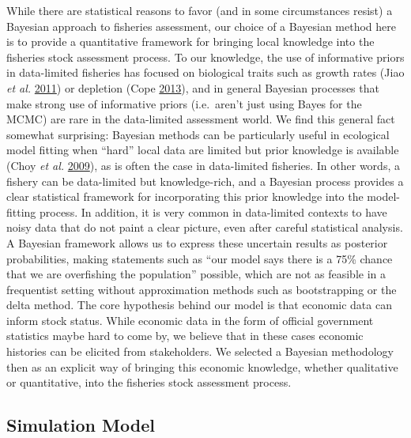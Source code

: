 \documentclass[twoside,12pt,final]{ucthesis-CA2012}
\begin{document}
\begin{ucmainmatter}
While there are statistical reasons to favor (and in some circumstances
resist) a Bayesian approach to fisheries assessment, our choice of a
Bayesian method here is to provide a quantitative framework for bringing
local knowledge into the fisheries stock assessment process. To our
knowledge, the use of informative priors in data-limited fisheries has
focused on biological traits such as growth rates (Jiao \emph{et al.}
\protect\hyperlink{ref-Jiao2011}{2011}) or depletion (Cope
\protect\hyperlink{ref-Cope2013}{2013}), and in general Bayesian
processes that make strong use of informative priors (i.e.~aren't just
using Bayes for the MCMC) are rare in the data-limited assessment world.
We find this general fact somewhat surprising: Bayesian methods can be
particularly useful in ecological model fitting when ``hard'' local data
are limited but prior knowledge is available (Choy \emph{et al.}
\protect\hyperlink{ref-Choy2009}{2009}), as is often the case in
data-limited fisheries. In other words, a fishery can be data-limited
but knowledge-rich, and a Bayesian process provides a clear statistical
framework for incorporating this prior knowledge into the model-fitting
process. In addition, it is very common in data-limited contexts to have
noisy data that do not paint a clear picture, even after careful
statistical analysis. A Bayesian framework allows us to express these
uncertain results as posterior probabilities, making statements such as
``our model says there is a 75\% chance that we are overfishing the
population'' possible, which are not as feasible in a frequentist
setting without approximation methods such as bootstrapping or the delta
method. The core hypothesis behind our model is that economic data can
inform stock status. While economic data in the form of official
government statistics maybe hard to come by, we believe that in these
cases economic histories can be elicited from stakeholders. We selected
a Bayesian methodology then as an explicit way of bringing this economic
knowledge, whether qualitative or quantitative, into the fisheries stock
assessment process.

\subsection{Simulation Model}\label{simulation-model-1}


\end{ucmainmatter}
\end{document}
